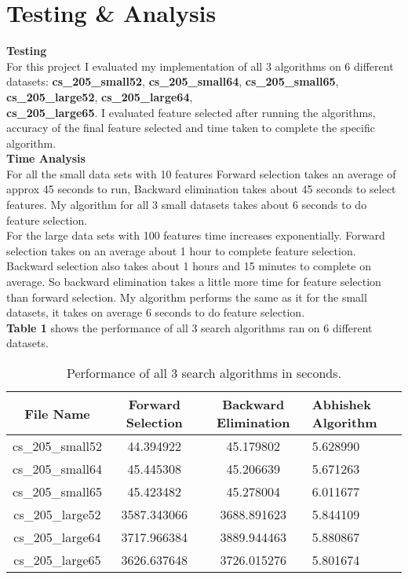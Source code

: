 \documentclass[a4paper, 11pt]{article}
\begin{document}
\section*{Testing \& Analysis}
\textbf{Testing} \\
For this project I evaluated my implementation of all 3 algorithms on 6 different datasets: \textbf{cs\_205\_small52}, \textbf{cs\_205\_small64}, \textbf{cs\_205\_small65}, \textbf{cs\_205\_large52}, \textbf{cs\_205\_large64},\\ \textbf{cs\_205\_large65}. I evaluated feature selected after running the algorithms, accuracy of the final feature selected and time taken to complete the specific algorithm. \\
\textbf{Time Analysis} \\
For all the small data sets with 10 features Forward selection takes an average of approx 45 seconds to run, Backward elimination takes about 45 seconds to select features. My algorithm for all 3 small datasets takes about 6 seconds to do feature selection. \\
For the large data sets with 100 features time increases exponentially. Forward selection takes on an average about 1 hour to complete feature selection. Backward selection also takes about 1 hours and 15 minutes to complete on average. So backward elimination takes a little more time for feature selection than forward selection. My algorithm performs the same as it for the small datasets, it takes on average 6 seconds to do feature selection. \\
\textbf{Table 1} shows the performance of all 3 search algorithms ran on 6 different datasets.\\

\begin{table}
	\centering
	\caption{Performance of all 3 search algorithms in seconds.}
	\begin{tabular}{|c|c|c|l|} \hline
		File Name&Forward Selection&Backward Elimination&Abhishek Algorithm\\ \hline
		cs\_205\_small52 & 44.394922 & 45.179802 & 5.628990\\ \hline
		cs\_205\_small64 & 45.445308 & 45.206639 & 5.671263\\ \hline
		cs\_205\_small65 & 45.423482 & 45.278004 & 6.011677\\ \hline
		cs\_205\_large52 & 3587.343066 & 3688.891623 & 5.844109\\ \hline
		cs\_205\_large64 & 3717.966384 & 3889.944463 & 5.880867\\ \hline
		cs\_205\_large65 & 3626.637648 & 3726.015276 & 5.801674\\ \hline
	\end{tabular}
\end{table}
\end{document}
